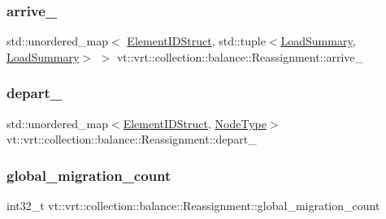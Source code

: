 \subsubsection{\texorpdfstring{arrive\+\_\+}{arrive\_}}
{\footnotesize\ttfamily std\+::unordered\+\_\+map$<$ \hyperlink{namespacevt_1_1vrt_1_1collection_1_1balance_a9f5b53fafb270212279a4757d2c4cd28}{Element\+I\+D\+Struct}, std\+::tuple$<$\hyperlink{structvt_1_1vrt_1_1collection_1_1balance_1_1_load_summary}{Load\+Summary}, \hyperlink{structvt_1_1vrt_1_1collection_1_1balance_1_1_load_summary}{Load\+Summary}$>$ $>$ vt\+::vrt\+::collection\+::balance\+::\+Reassignment\+::arrive\+\_\+}

\mbox{\label{structvt_1_1vrt_1_1collection_1_1balance_1_1_reassignment_a8fa0e732209e0f186eb10a15b29a0914}} 
\subsubsection{\texorpdfstring{depart\+\_\+}{depart\_}}
{\footnotesize\ttfamily std\+::unordered\+\_\+map$<$\hyperlink{namespacevt_1_1vrt_1_1collection_1_1balance_a9f5b53fafb270212279a4757d2c4cd28}{Element\+I\+D\+Struct}, \hyperlink{namespacevt_a866da9d0efc19c0a1ce79e9e492f47e2}{Node\+Type}$>$ vt\+::vrt\+::collection\+::balance\+::\+Reassignment\+::depart\+\_\+}

\mbox{\label{structvt_1_1vrt_1_1collection_1_1balance_1_1_reassignment_a4887608a57a19a896481f22d2ad11ce2}} 
\subsubsection{\texorpdfstring{global\+\_\+migration\+\_\+count}{global\_migration\_count}}
{\footnotesize\ttfamily int32\+\_\+t vt\+::vrt\+::collection\+::balance\+::\+Reassignment\+::global\+\_\+migration\+\_\+count}

